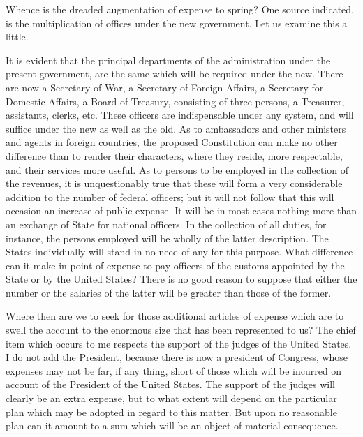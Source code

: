 Whence is the dreaded augmentation of expense to spring? 
One source indicated, is the multiplication of offices under the new government. 
Let us examine this a little.

It is evident that the principal departments of the administration under the present government, are the same which will be required under the new. 
There are now a Secretary of War, a Secretary of Foreign Affairs, a Secretary for Domestic Affairs, a Board of Treasury, consisting of three persons, a Treasurer, assistants, clerks, etc. 
These officers are indispensable under any system, and will suffice under the new as well as the old. 
As to ambassadors and other ministers and agents in foreign countries, the proposed Constitution can make no other difference than to render their characters, where they reside, more respectable, and their services more useful. 
As to persons to be employed in the collection of the revenues, it is unquestionably true that these will form a very considerable addition to the number of federal officers; but it will not follow that this will occasion an increase of public expense. 
It will be in most cases nothing more than an exchange of State for national officers. 
In the collection of all duties, for instance, the persons employed will be wholly of the latter description. 
The States individually will stand in no need of any for this purpose. 
What difference can it make in point of expense to pay officers of the customs appointed by the State or by the United States? 
There is no good reason to suppose that either the number or the salaries of the latter will be greater than those of the former.

Where then are we to seek for those additional articles of expense which are to swell the account to the enormous size that has been represented to us? 
The chief item which occurs to me respects the support of the judges of the United States. 
I do not add the President, because there is now a president of Congress, whose expenses may not be far, if any thing, short of those which will be incurred on account of the President of the United States. 
The support of the judges will clearly be an extra expense, but to what extent will depend on the particular plan which may be adopted in regard to this matter. 
But upon no reasonable plan can it amount to a sum which will be an object of material consequence.

